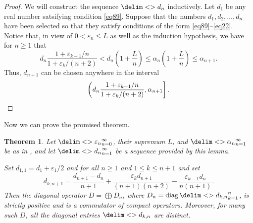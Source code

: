 \documentclass[10pt,reqno]{amsart}
\newtheorem{theorem}{Theorem}[section]
\theoremstyle{remark}
\DeclareMathOperator{\diag}{diag}
\newcommand{\seq}{\delim<>}
\numberwithin{equation}{section}
\begin{document}
\begin{proof}
  We will construct the sequence $\seq{d_n}$ inductively.
  Let $d_1$ be any real number satsifying condition \eqref{eq89}.
  Suppose that the numbers $d_1,d_2,\dots,d_n$ have been selected so that they satisfy conditions of the form \eqref{eq89}--\eqref{eq22}.
  Notice that, in view of $0<\varepsilon_n\le L$ as well as the induction hypothesis, we have for $n\ge 1$ that
  \begin{equation*}
    d_n \dfrac{1+\varepsilon_{k-1}/n}{1+\varepsilon_{k}/(n+2)}<d_n\left(
      1+\dfrac{L}{n}\right)\le \alpha_n\left(
      1+\dfrac{L}{n}\right)\le \alpha_{n+1}.
  \end{equation*}
  Thus, $d_{n+1}$ can be chosen anywhere in the interval
  \begin{equation}
    \label{eq79}
    \left(d_n \dfrac{1+\varepsilon_{k-1}/n}{1+\varepsilon_{k}/(n+2)}, \alpha_{n+1}\right]. \qedhere
  \end{equation}
\end{proof}

Now we can prove the promised theorem.
\begin{theorem}
  \label{t7}
  Let $\seq{\varepsilon_n}_{n=0}^\infty$, their supremum
  $L$, and $\seq{\alpha_n}_{n=1}^\infty$ be as in , and let $\seq{d_n}_{n=1}^\infty$ be a sequence provided by this lemma.

  Set $d_{1,1}=d_1 + \varepsilon_1/2$ and for all $n\ge 1$ and $1\le k\le n+1$ and set
  \begin{equation}
    \label{eq12}
    d_{k,n+1}=\frac{d_{n+1}-d_n}{n+1}+\frac{\varepsilon_k d_{n+1}}{(n+1)(n+2)}-\frac{\varepsilon_{k-1}d_n}{n(n+1)}.
  \end{equation}
  Then the diagonal operator $D = \bigoplus D_n$, where $D_n = \diag \seq{d_{k,n}}_{k=1}^n$, is strictly positive and is a commutator of compact operators.
  Moreover, for many such $D$, all the diagonal entries $\seq{d_{k,n}}$ are distinct.
\end{theorem}
\end{document}
